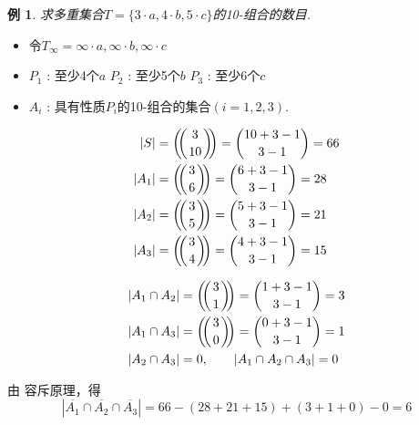 \documentclass[punct]{ctexbeamer}
\newtheorem{ex}{例}
\def\multiset#1#2{\ensuremath{\left(\kern-.3em\left(\genfrac{}{}{0pt}{}{#1}{#2}\right)\kern-.3em\right)}}
\begin{document}
\begin{frame}
	\begin{ex}
		求多重集合$T=\{3\cdot a,4\cdot b,5\cdot c \}$的10-组合的数目.
	\end{ex}\pause
\begin{itemize}
\item 令$T_{\infty}=\infty\cdot a,\infty\cdot b,\infty\cdot c$
\item
$P_{1}$ :  至少4个$a$  \quad
$P_{2}$ :  至少5个$b$ \quad
$P_{3}$ :  至少6个$c$
\item $A_{i}$ :  具有性质$P_{i}$的10-组合的集合$(i=1,2,3)$.



\end{itemize}
\[
\begin{aligned}
|S|  & =\multiset{3}{10}= \binom{10+3-1}{3-1}=66  \\
|A_{1}| & =\multiset{3}{6}= \binom{6+3-1}{3-1}=28\\
|A_{2}| &=\multiset{3}{5}=\binom{5+3-1}{3-1}=21\\
|A_{3}| & =\multiset{3}{4}=\binom{4+3-1}{3-1}=15
\end{aligned}
\]
\end{frame}

\begin{frame}
\[\begin{aligned}
	|A_{1}\cap A_{2}|& =\multiset{3}{1}=\binom{1+3-1}{3-1}=3\\
	|A_{1}\cap A_{3}|& =\multiset{3}{0}=\binom{0+3-1}{3-1}=1\\
    |A_{2}\cap A_{3}|& =0, \quad\quad
    |A_{1}\cap A_{2}\cap A_{3}| =0
\end{aligned}\]


由 容斥原理，得
\[|\overline{A_{1}} \cap \overline{A_{2}} \cap \overline{A_{3}}|=66-(28+21+15)+(3+1+0)-0=6\]
\end{frame}


%
%
\end{document}
